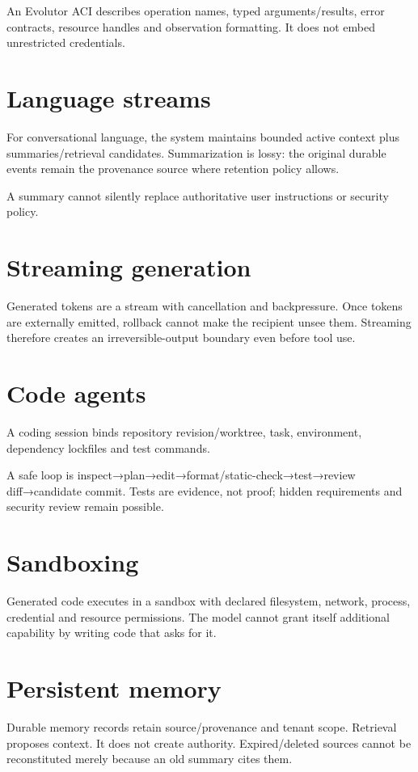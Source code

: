 An Evolutor ACI describes operation names, typed arguments/results, error contracts, resource handles and observation formatting. It does not embed unrestricted credentials.

\section{Language streams}
For conversational language, the system maintains bounded active context plus summaries/retrieval candidates. Summarization is lossy: the original durable events remain the provenance source where retention policy allows.

A summary cannot silently replace authoritative user instructions or security policy.

\section{Streaming generation}
Generated tokens are a stream with cancellation and backpressure. Once tokens are externally emitted, rollback cannot make the recipient unsee them. Streaming therefore creates an irreversible-output boundary even before tool use.

\section{Code agents}
A coding session binds repository revision/worktree, task, environment, dependency lockfiles and test commands.

A safe loop is inspect→plan→edit→format/static-check→test→review diff→candidate commit. Tests are evidence, not proof; hidden requirements and security review remain possible.

\section{Sandboxing}
Generated code executes in a sandbox with declared filesystem, network, process, credential and resource permissions. The model cannot grant itself additional capability by writing code that asks for it.

\section{Persistent memory}
Durable memory records retain source/provenance and tenant scope. Retrieval proposes context. It does not create authority. Expired/deleted sources cannot be reconstituted merely because an old summary cites them.

